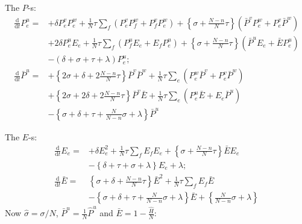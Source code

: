 \documentclass[preprint, 
superscriptaddress,aip,author-year]{revtex4-1}
\begin{document}
\noindent The $P$-s:
\begin{align}
 \frac{\mathrm{d}}{\mathrm{d} t} P_e^u  =&  
+ \delta P_e^v  P_e^w + \frac{1}{N} \tau \sum_f  \left( P_e^v P_f^w +
  P_f^v P_e^w  \right) + \left\{ \sigma + \frac{N-n}{N} \tau
\right\}\left(  \bar P^v P_e^w +P_e^v \bar P^w \right)\nonumber \\
&+ 2 \delta P_e^u E_e + \frac{1}{N} \tau \sum_f  \left( P_f^u E_e 
+ E_f P_e^u \right) + \left\{ \sigma +  \frac{N-n}{N} \tau \right\} \left(\bar P^u  E_e + \bar E  P_e^u\right) \nonumber \\
& -  ( \delta    +  \sigma  + \tau  + \lambda ) P_e^u;
\tag{PE}\\ 
\frac{\mathrm{d}}{\mathrm{d} t}  \bar P^u =& 
 +\left\{ 2 \sigma+  \delta + 2 \frac{N-n}{N} \tau \right\} \bar P^v \bar P^w  + \frac{1}{N}\tau \sum_e \left( P_e^w \bar P^v +  P_e^v \bar P^w \right) \nonumber \\
&  +\left\{ 2 \sigma+  2\delta + 2 \frac{N-n}{N} \tau \right\} \bar P^v  \bar E  + \frac{1}{N}\tau \sum_e \left( P_e^u \bar E +  E_e \bar P^u \right) 
\nonumber \\
& -\left\{\sigma + \delta +\tau + \frac{N}{N-n} \sigma + \lambda \right\}  \bar P^u
\tag{PB}
\end{align}


\noindent The $E$-s:
\begin{align}
\frac{\mathrm{d}}{\mathrm{d} t} E_e =&
+\delta E_e^2 + \frac{1}{N} \tau\sum_{f } E_f  E_e  + \left\{ \sigma  + \frac{N-n}{N} \tau \right\}\bar E  E_e\nonumber \\
& - \left\{ \delta + \tau + \sigma + \lambda \right\} E_e +\lambda; \tag{EE} \\
\frac{\mathrm{d}}{\mathrm{d} t} {\bar E} =&
\left\{ \sigma  + \delta +  \frac{N-n}{N} \tau\right\}  \bar E^2 +\frac{1}{N} \tau\sum_{f } E_f \bar E \nonumber \\
& - \left\{ \sigma  + \delta +  \tau + \frac{N}{N-n} \sigma +  \lambda \right\}\bar E  +  \left\{\frac{N}{N-n} \sigma +  \lambda \right\}
\tag{EB} 
 \end{align}
\newpage
Now $\hat \sigma= \sigma/N$, $\bar P^u = \frac{1}{N}\hat P^u $ and $\bar E = 1-\frac{\hat H }{N}$:
\end{document}
